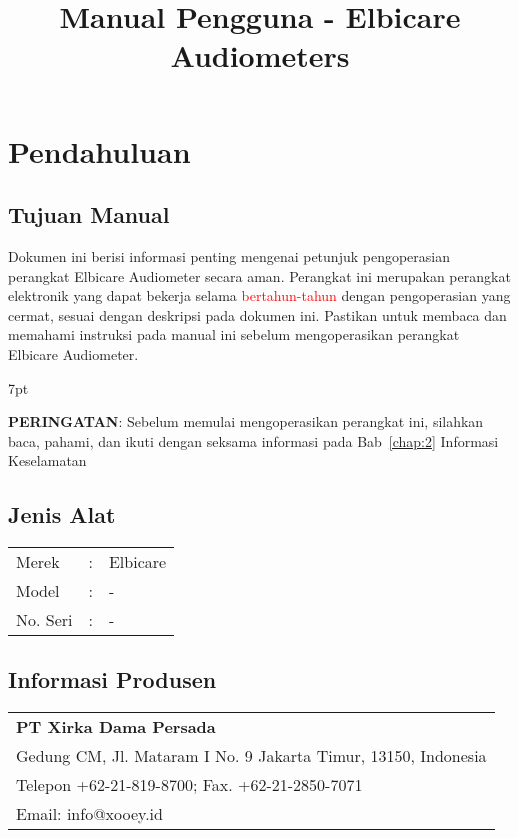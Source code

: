 \documentclass[11pt,a4paper,twoside,draft,onecolumn]{book}
\title{Manual Pengguna - Elbicare Audiometers}
\newenvironment{formalred}{%
	\def\FrameCommand{%
		\hspace{1pt}%
		{\color{red}\vrule width 2pt}%
		{\color{formalshade}\vrule width 4pt}%
		\colorbox{formalshade}%
	}%
	\MakeFramed{\advance\hsize-\width\FrameRestore}%
	\noindent\hspace{-4.55pt}%
	\begin{adjustwidth}{}{7pt}%
		\vspace{2pt}\vspace{2pt}%
	}
	{%
		\vspace{2pt}\end{adjustwidth}\endMakeFramed%
}
\begin{document}
	
	\maketitle
	\renewcommand\contentsname{Daftar Isi}
	\tableofcontents
	
	\renewcommand\listfigurename{Daftar Gambar}
	\listoffigures
	
	\renewcommand\listtablename{Daftar Tabel}
	\listoftables
	\newpage
	
	\renewcommand\chaptername{Bab}
	
	\chapter{Pendahuluan}
		\section{Tujuan Manual}
		Dokumen ini berisi informasi penting mengenai petunjuk pengoperasian perangkat Elbicare Audiometer secara aman. Perangkat ini merupakan perangkat elektronik yang dapat bekerja selama \textcolor{red}{bertahun-tahun} dengan pengoperasian yang cermat, sesuai dengan deskripsi pada dokumen ini. Pastikan untuk membaca dan memahami instruksi pada manual ini sebelum mengoperasikan perangkat Elbicare Audiometer. 
		
		\begin{formalred}
			\raisebox{0.325ex}{\resizebox{!}{1.2ex}{\danger}} \textbf{PERINGATAN}:
			Sebelum memulai mengoperasikan perangkat ini, silahkan baca, pahami, dan ikuti dengan seksama informasi pada Bab~\ref{chap:2} Informasi Keselamatan 
		\end{formalred}
		
		\section{Jenis Alat}
		\begin{tabular}{lcl}
			Merek & : & Elbicare\\
			Model & : & -\\
			No. Seri & : & -\\
		\end{tabular}
		
		\section{Informasi Produsen}
		\begin{tabular}{l}
			\textbf{PT Xirka Dama Persada}\\
			Gedung CM, Jl. Mataram I No. 9 Jakarta Timur, 13150, Indonesia\\
			Telepon +62-21-819-8700; Fax. +62-21-2850-7071\\
			Email: info@xooey.id\\
		\end{tabular}
		
\end{document}
